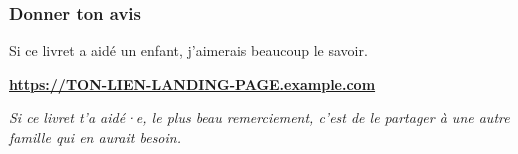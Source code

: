 \documentclass[
  french,
  14pt,
  a4paper,
]{extarticle}
\begin{document}
\subsubsection*{Donner ton avis}

Si ce livret a aidé un enfant, j'aimerais beaucoup le savoir.

\begin{center}
\textbf{\url{https://TON-LIEN-LANDING-PAGE.example.com}}
\end{center}

\vfill

\begin{center}
\textit{Si ce livret t'a aidé·e, le plus beau remerciement, c'est de le partager à une autre famille qui en aurait besoin.}
\end{center}

\vspace{1cm}
\end{document}
